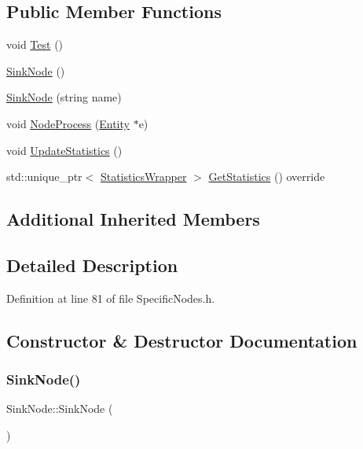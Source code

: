 \subsection*{Public Member Functions}
\begin{DoxyCompactItemize}
\item 
void \hyperlink{class_sink_node_adffbd13ea7f32f79b585b7a8955d1d45}{Test} ()
\item 
\hyperlink{class_sink_node_a098ae3f4e358acdfe3e3aa0906b41c60}{Sink\+Node} ()
\item 
\hyperlink{class_sink_node_a0c3227da9d4ca0757f3512e4473c9b5c}{Sink\+Node} (string name)
\item 
void \hyperlink{class_sink_node_a5f3fe2c195c3bb154f27bdf3ae27dd27}{Node\+Process} (\hyperlink{class_entity}{Entity} $\ast$e)
\item 
void \hyperlink{class_sink_node_adf5f0001fd1d3d61725ff6a6f5b40ba7}{Update\+Statistics} ()
\item 
std\+::unique\+\_\+ptr$<$ \hyperlink{class_generic_node_1_1_statistics_wrapper}{Statistics\+Wrapper} $>$ \hyperlink{class_sink_node_ad6aeb0857d3ddd9511cd5d24974e1fac}{Get\+Statistics} () override
\end{DoxyCompactItemize}
\subsection*{Additional Inherited Members}


\subsection{Detailed Description}


Definition at line 81 of file Specific\+Nodes.\+h.



\subsection{Constructor \& Destructor Documentation}
\mbox{\label{class_sink_node_a098ae3f4e358acdfe3e3aa0906b41c60}} 
\subsubsection{\texorpdfstring{Sink\+Node()}{SinkNode()}\hspace{0.1cm}{\footnotesize\ttfamily [1/2]}}
{\footnotesize\ttfamily Sink\+Node\+::\+Sink\+Node (\begin{DoxyParamCaption}{ }\end{DoxyParamCaption})}



